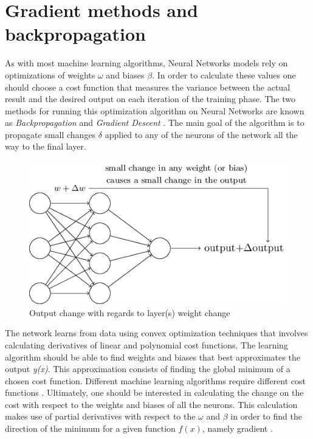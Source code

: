 \section{Gradient methods and backpropagation}

As with most machine learning algorithms, Neural Networks models rely on optimizations of weights $\omega$ and biases $\beta$. In order to calculate these values one should  choose a cost function that measures the variance between the actual result and the desired output on each iteration of the training phase. The two methods for running this optimization algorithm on Neural Networks are known as \textit{Backpropagation} and \textit{Gradient Descent} \cite{goodfellow2016_book}. The main goal of the algorithm is to propagate small changes $\delta$ applied to any of the neurons of the network all the way to the final layer.

\begin{figure}[h!]
\centering
	\includegraphics[scale=0.5]{net_change.png}
\caption{Output change with regards to layer(s) weight change \cite{nielsen2016}}
\label{fig:net_change}
\end{figure}


The network learns from data using convex optimization techniques that involves calculating derivatives of linear and polynomial cost functions. The learning algorithm should be able to find weights and biases that best approximates the output \textit{y(x)}. This approximation consists of finding the global minimum of a chosen cost function. Different machine learning algorithms require different cost functions \cite{nielsen2016}. Ultimately, one should be interested in calculating the change on the cost with respect to the weights and biases of all the neurons. This calculation makes use of partial derivatives with respect to the $\omega$ and $\beta$ in order to find the direction of the minimum for a given function $f(x)$, namely gradient \cite{goodfellow2016_book}.

